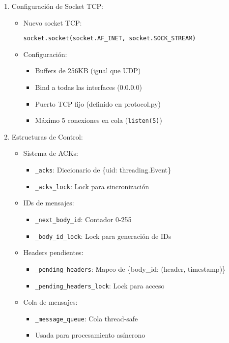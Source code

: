 \documentclass[12pt]{article}
\begin{document}
\begin{enumerate}
    \item Configuración de Socket TCP:
    \begin{itemize}
        \item Nuevo socket TCP:
        \begin{verbatim}
socket.socket(socket.AF_INET, socket.SOCK_STREAM)
        \end{verbatim}
        \item Configuración:
        \begin{itemize}
            \item Buffers de 256KB (igual que UDP)
            \item Bind a todas las interfaces (0.0.0.0)
            \item Puerto TCP fijo (definido en protocol.py)
            \item Máximo 5 conexiones en cola (\texttt{listen(5)})
        \end{itemize}
    \end{itemize}

    \item Estructuras de Control:
    \begin{itemize}
        \item Sistema de ACKs:
        \begin{itemize}
            \item \texttt{\_acks}: Diccionario de \{uid: threading.Event\}
            \item \texttt{\_acks\_lock}: Lock para sincronización
        \end{itemize}
        \item IDs de mensajes:
        \begin{itemize}
            \item \texttt{\_next\_body\_id}: Contador 0-255
            \item \texttt{\_body\_id\_lock}: Lock para generación de IDs
        \end{itemize}
        \item Headers pendientes:
        \begin{itemize}
            \item \texttt{\_pending\_headers}: Mapeo de \{body\_id: (header, timestamp)\}
            \item \texttt{\_pending\_headers\_lock}: Lock para acceso
        \end{itemize}
        \item Cola de mensajes:
        \begin{itemize}
            \item \texttt{\_message\_queue}: Cola thread-safe
            \item Usada para procesamiento asíncrono
        \end{itemize}
    \end{itemize}


\end{enumerate}
\end{document}
